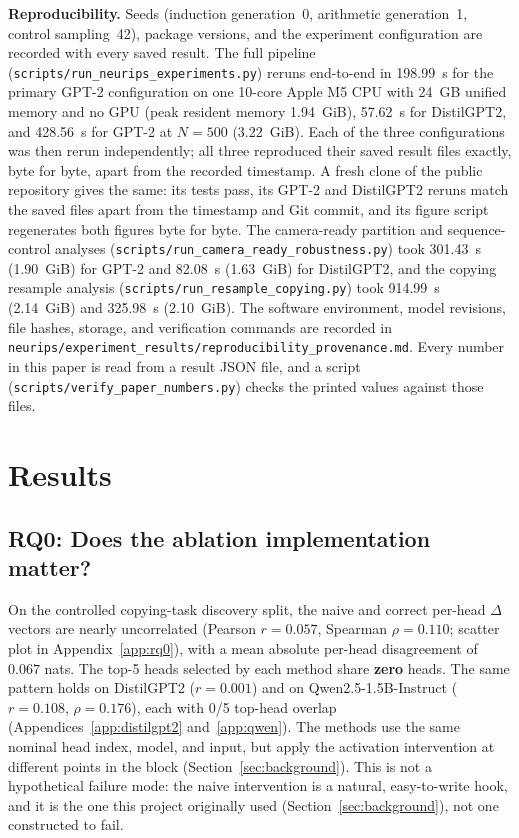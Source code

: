 \documentclass{article}
\begin{document}
\textbf{Reproducibility.} Seeds (induction generation~0, arithmetic
generation~1, control sampling~42), package versions, and the experiment
configuration are recorded with every saved result. The full pipeline
(\texttt{scripts/run\_neurips\_experiments.py}) reruns end-to-end in
198.99~s for the primary GPT-2 configuration on one 10-core Apple M5 CPU
with 24~GB unified memory and no GPU (peak resident memory 1.94~GiB),
57.62~s for DistilGPT2, and 428.56~s for GPT-2 at $N=500$ (3.22~GiB).
Each of the three configurations was then rerun independently; all three
reproduced their saved result files exactly, byte for byte, apart from
the recorded timestamp. A fresh clone of the public repository gives the
same: its tests pass, its GPT-2 and DistilGPT2 reruns match the saved
files apart from the timestamp and Git commit, and its figure script
regenerates both figures byte for byte. The camera-ready partition and sequence-control
analyses (\texttt{scripts/run\_camera\_ready\_robustness.py}) took
301.43~s (1.90~GiB) for GPT-2 and 82.08~s (1.63~GiB) for DistilGPT2,
and the copying resample analysis
(\texttt{scripts/run\_resample\_copying.py}) took 914.99~s (2.14~GiB)
and 325.98~s (2.10~GiB).
The software environment, model revisions,
file hashes, storage, and verification commands are recorded in
\texttt{neurips/experiment\_results/reproducibility\_provenance.md}. Every
number in this paper is read from a result JSON file, and a script
(\texttt{scripts/verify\_paper\_numbers.py}) checks the printed values
against those files.


\section{Results}
\label{sec:results}

\subsection{RQ0: Does the ablation implementation matter?}
\label{sec:rq0}

On the controlled copying-task discovery split, the naive and correct per-head
$\Delta$ vectors are nearly uncorrelated (Pearson $r=0.057$, Spearman
$\rho=0.110$; scatter plot in Appendix~\ref{app:rq0}), with a mean
absolute per-head disagreement of $0.067$ nats. The top-5 heads selected by each method share
\textbf{zero} heads. The same pattern holds on DistilGPT2 ($r=0.001$)
and on Qwen2.5-1.5B-Instruct ($r=0.108$, $\rho=0.176$), each with 0/5
top-head overlap (Appendices~\ref{app:distilgpt2} and~\ref{app:qwen}). The methods use the same nominal head index,
model, and input, but apply the activation intervention at different
points in the block (Section~\ref{sec:background}).
This is not a hypothetical failure mode: the naive intervention is a
natural, easy-to-write hook, and it is the one this project originally
used (Section~\ref{sec:background}), not one constructed to fail.
\end{document}
